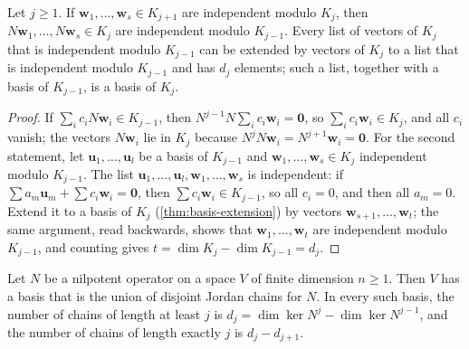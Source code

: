 \begin{lemma}
\label{lem:chain-step}
Let $j\ge1$. If $\mathbf w_1,\ldots,\mathbf w_s\in K_{j+1}$ are independent modulo $K_j$, then $N\mathbf w_1,\ldots,N\mathbf w_s\in K_j$ are independent modulo $K_{j-1}$. Every list of vectors of $K_j$ that is independent modulo $K_{j-1}$ can be extended by vectors of $K_j$ to a list that is independent modulo $K_{j-1}$ and has $d_j$ elements; such a list, together with a basis of $K_{j-1}$, is a basis of $K_j$.
\end{lemma}

\begin{proof}
If $\sum_ic_iN\mathbf w_i\in K_{j-1}$, then $N^{j-1}N\sum_ic_i\mathbf w_i=\mathbf 0$, so $\sum_ic_i\mathbf w_i\in K_j$, and all $c_i$ vanish; the vectors $N\mathbf w_i$ lie in $K_j$ because $N^jN\mathbf w_i=N^{j+1}\mathbf w_i=\mathbf 0$. For the second statement, let $\mathbf u_1,\ldots,\mathbf u_l$ be a basis of $K_{j-1}$ and $\mathbf w_1,\ldots,\mathbf w_s\in K_j$ independent modulo $K_{j-1}$. The list $\mathbf u_1,\ldots,\mathbf u_l,\mathbf w_1,\ldots,\mathbf w_s$ is independent: if $\sum a_m\mathbf u_m+\sum c_i\mathbf w_i=\mathbf 0$, then $\sum c_i\mathbf w_i\in K_{j-1}$, so all $c_i=0$, and then all $a_m=0$. Extend it to a basis of $K_j$ (\cref{thm:basis-extension}) by vectors $\mathbf w_{s+1},\ldots,\mathbf w_t$; the same argument, read backwards, shows that $\mathbf w_1,\ldots,\mathbf w_t$ are independent modulo $K_{j-1}$, and counting gives $t=\dim K_j-\dim K_{j-1}=d_j$.
\end{proof}

\begin{theorem}
\label{thm:chain-basis}
Let $N$ be a nilpotent operator on a space $V$ of finite dimension $n\ge1$. Then $V$ has a basis that is the union of disjoint Jordan chains for $N$. In every such basis, the number of chains of length at least $j$ is $d_j=\dim\ker N^j-\dim\ker N^{j-1}$, and the number of chains of length exactly $j$ is $d_j-d_{j+1}$.
\end{theorem}

